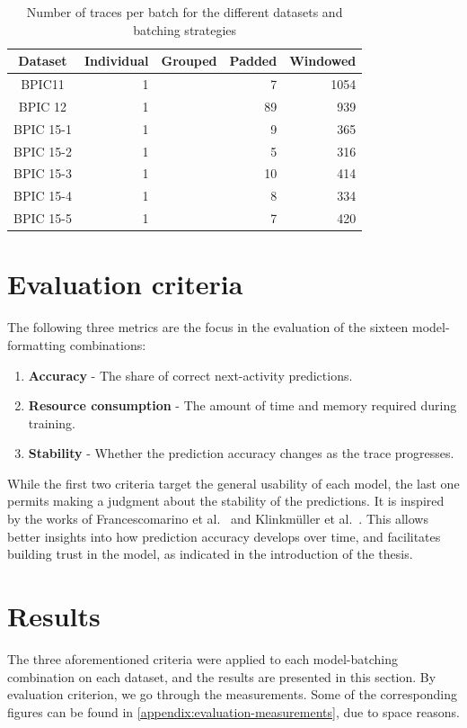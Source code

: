 
\begin{table}
\centering
\begin{tabular}{c|rrrr}
Dataset & Individual & Grouped & Padded & Windowed \\
\hline
BPIC11    & 1 & & 7 & 1054\\
BPIC 12   & 1 & & 89 & 939\\
BPIC 15-1 & 1 & & 9 & 365\\
BPIC 15-2 & 1 & & 5 & 316\\
BPIC 15-3 & 1 & & 10 & 414\\
BPIC 15-4 & 1 & & 8 & 334\\
BPIC 15-5 & 1 & & 7 & 420\\
\end{tabular}
\caption{Number of traces per batch for the different datasets and batching strategies}
\label{tab:batch-sizes}
\end{table}

\section{Evaluation criteria}
\label{sec:eval:criteria}
The following three metrics are the focus in the evaluation of the sixteen model-formatting combinations:

\begin{enumerate}
    \item\textbf{Accuracy} - The share of correct next-activity predictions.
    \item\textbf{Resource consumption} - The amount of time and memory required during training.
    \item\textbf{Stability} - Whether the prediction accuracy changes as the trace progresses.
\end{enumerate}

While the first two criteria target the general usability of each model, the last one permits making a judgment about the stability of the predictions. It is inspired by the works of Francescomarino et al.~\cite{francescomarino2015} and Klinkmüller et al.~\cite{klinkmuller2018reliablemonitoring}. This allows better insights into how prediction accuracy develops over time, and facilitates building trust in the model, as indicated in the introduction of the thesis.

\section{Results}\label{sec:eval:results}
The three aforementioned criteria were applied to each model-batching combination on each dataset, and the results are presented in this section. By evaluation criterion, we go through the measurements. Some of the corresponding figures can be found in \autoref{appendix:evaluation-measurements}, due to space reasons.

